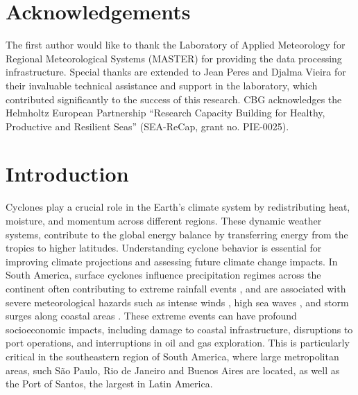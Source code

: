 \documentclass[pdflatex,sn-chicago]{sn-jnl}%
\theoremstyle{plain}
\theoremstyle{definition}
\theoremstyle{remark}
\theoremstyle{definition}
\begin{document}


\maketitle

\section*{Acknowledgements}

The first author would like to thank the Laboratory of Applied Meteorology for Regional Meteorological Systems (MASTER) for providing the data processing infrastructure. Special thanks are extended to Jean Peres and Djalma Vieira for their invaluable technical assistance and support in the laboratory, which contributed significantly to the success of this research. CBG acknowledges the Helmholtz European Partnership “Research Capacity Building for Healthy, Productive and Resilient Seas” (SEA-ReCap, grant no. PIE-0025).

\section{Introduction}\label{sec1}

Cyclones play a crucial role in the Earth's climate system by redistributing heat, moisture, and momentum across different regions. These dynamic weather systems, contribute to the global energy balance by transferring energy from the tropics to higher latitudes. Understanding cyclone behavior is essential for improving climate projections and assessing future climate change impacts. In South America, surface cyclones influence precipitation regimes across the continent \citep{reboita2010precipitation, reboita2018extratropical, de2022hybrid} often contributing to extreme rainfall events \citep[e.g.,][]{de2021ocean,de2024extreme}, and are associated with severe meteorological hazards such as intense winds \citep{cardoso2022synoptic,de2021ocean}, high sea waves \citep{da2025classification,gramcianinov2023impact}, and storm surges along coastal areas \citep{leal2023identification,tecchiomean}. These extreme events can have profound socioeconomic impacts, including damage to coastal infrastructure, disruptions to port operations, and interruptions in oil and gas exploration. This is particularly critical in the southeastern region of South America, where large metropolitan areas, such São Paulo, Rio de Janeiro and Buenos Aires are located, as well as the Port of Santos, the largest in Latin America. 
\end{document}
